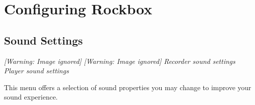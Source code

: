 \chapter{Configuring Rockbox}

\section{Sound Settings}
{\centering\itshape
  [Warning: Image ignored] %
 \textmd{  }  [Warning: Image ignored]
 \newline
Recorder sound settings  Player sound settings  
\par}

This menu offers a selection of sound properties you may change to
improve your sound experience.

